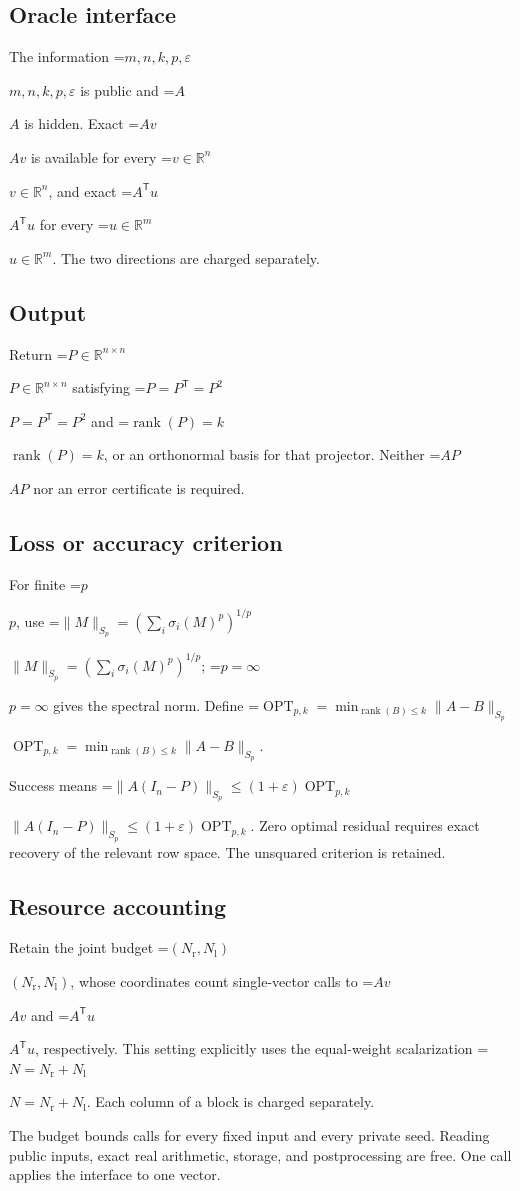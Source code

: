\documentclass[10pt,a4paper]{article}
\newcommand{\AtlasMath}[1]{\par\begingroup\centering\setbox0=\hbox{$\displaystyle #1$}\ifdim\wd0>1.4\linewidth\typeout{ATLAS WIDE FORMULA: \the\wd0}\fi\ifdim\wd0>\linewidth\resizebox{\linewidth}{!}{\box0}\else\box0\fi\par\endgroup}
\newcommand{\AtlasInlineMath}[1]{\begingroup\setbox0=\hbox{$#1$}\ifdim\wd0>.4\linewidth\endgroup\AtlasMath{#1}\else\endgroup$#1$\fi}
\begin{document}
\subsection{Oracle interface}
The information \AtlasInlineMath{m,n,k,p,\varepsilon} is public and \AtlasInlineMath{A} is hidden. Exact \AtlasInlineMath{Av} is available for every \AtlasInlineMath{v\in\mathbb{R}^n}, and exact \AtlasInlineMath{A^{\mathsf T}u} for every \AtlasInlineMath{u\in\mathbb{R}^m}. The two directions are charged separately.

\subsection{Output}
Return \AtlasInlineMath{P\in\mathbb{R}^{n\times n}} satisfying \AtlasInlineMath{P=P^{\mathsf T}=P^2} and \AtlasInlineMath{\operatorname{rank}(P)=k}, or an orthonormal basis for that projector. Neither \AtlasInlineMath{AP} nor an error certificate is required.

\subsection{Loss or accuracy criterion}
For finite \AtlasInlineMath{p}, use \AtlasInlineMath{\|M\|_{S_p}=(\sum_i\sigma_i(M)^p)^{1/p}}; \AtlasInlineMath{p=\infty} gives the spectral norm. Define \AtlasInlineMath{\operatorname{OPT}_{p,k}=\min_{\operatorname{rank}(B)\le k}\|A-B\|_{S_p}}.

Success means \AtlasInlineMath{\|A(I_n-P)\|_{S_p}\le(1+\varepsilon)\operatorname{OPT}_{p,k}}. Zero optimal residual requires exact recovery of the relevant row space. The unsquared criterion is retained.

\subsection{Resource accounting}
Retain the joint budget \AtlasInlineMath{(N_{\mathrm{r}},N_{\mathrm{l}})}, whose coordinates count single-vector calls to \AtlasInlineMath{Av} and \AtlasInlineMath{A^{\mathsf T}u}, respectively. This setting explicitly uses the equal-weight scalarization \AtlasInlineMath{N=N_{\mathrm{r}}+N_{\mathrm{l}}}. Each column of a block is charged separately.

The budget bounds calls for every fixed input and every private seed. Reading public inputs, exact real arithmetic, storage, and postprocessing are free. One call applies the interface to one vector.
\end{document}
